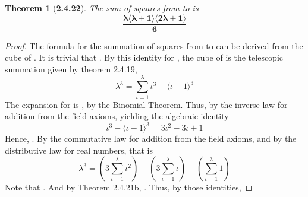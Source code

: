 \documentclass[a4paper, 12pt]{article}
\theoremstyle{plain}
\newtheorem*{theorem*}{Theorem}
\begin{document}
\begin{theorem*}[\textbf{2.4.22}]
    The sum of squares from  to \bm{$\lambda$} is 
    \begin{equation*}
        \bm{
            \frac{ 
                \lambda 
                \langle \lambda + 1 \rangle 
                \langle 2 \lambda + 1 \rangle 
            }
            {6}
        }
    \end{equation*}
\end{theorem*}
\begin{proof}
    The formula for the summation of squares 
    from  to \bm{$\lambda$} 
    can be derived from the cube of \bm{$\lambda$}.
    It is trivial that 
    . 
    By this identity for \bm{$\lambda$},
    the cube of \bm{$\lambda$} is the telescopic summation given by theorem 2.4.19, 
    \begin{equation*}
        \lambda ^3 
            = 
        \sum_{\iota=1}^\lambda \iota ^3 - \big \langle \iota - 1 \big \rangle ^3    
    \end{equation*}
    The expansion for 
    is 
    , 
    by the Binomial Theorem. 
    Thus, 
    by the inverse law for addition from the field axioms,
    yielding the algebraic identity
    \begin{equation*}
        \iota ^3 - \big \langle \iota - 1 \big \rangle ^3 
            = 
        3 \iota ^2 - 3 \iota + 1
    \end{equation*}
    Hence, 
    .
    By the commutative law for addition from the field axioms, 
    and by the distributive law for real numbers,
    that is
    \begin{equation*}
        \lambda ^3 
            = 
        \left( 3 \sum_{\iota=1}^\lambda \iota ^2 \right) 
            - 
        \left( 3 \sum_{\iota=1}^\lambda \iota \right) 
            + 
        \left( \sum_{\iota=1}^\lambda 1 \right)
    \end{equation*}
    Note that . 
    And by Theorem 2.4.21b, 
    . 
    Thus, 
    by those identities, 

\end{proof}
\end{document}
